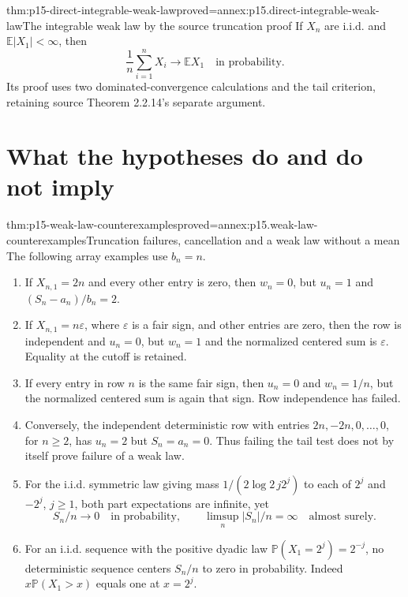 \begin{hbcorollary}{thm:p15-direct-integrable-weak-law}{proved=annex:p15.direct-integrable-weak-law}{The integrable weak law by the source truncation proof}
If \(X_n\) are i.i.d. and \(\mathbb E|X_1|<\infty\), then
\[
 \frac1n\sum_{i=1}^nX_i\longrightarrow\mathbb EX_1
                                         \quad\text{in probability}.
\]
Its proof uses two dominated-convergence calculations and the
tail criterion, retaining source Theorem 2.2.14's separate argument.
\end{hbcorollary}

\section{What the hypotheses do and do not imply}
\label{sec:p15-weak-law-boundaries}

\begin{hbtheorem}{thm:p15-weak-law-counterexamples}{proved=annex:p15.weak-law-counterexamples}{Truncation failures, cancellation and a weak law without a mean}
The following array examples use \(b_n=n\).
\begin{enumerate}
\item If \(X_{n,1}=2n\) and every other entry is zero, then
\(w_n=0\), but \(u_n=1\) and \((S_n-a_n)/b_n=2\).
\item If \(X_{n,1}=n\varepsilon\), where \(\varepsilon\) is a
fair sign, and other entries are zero, then the row is independent
and \(u_n=0\), but \(w_n=1\) and the normalized centered sum
is \(\varepsilon\). Equality at the cutoff is retained.
\item If every entry in row \(n\) is the same fair sign, then
\(u_n=0\) and \(w_n=1/n\), but the normalized centered sum is
again that sign. Row independence has failed.
\item Conversely, the independent deterministic row with entries
\(2n,-2n,0,\ldots,0\), for \(n\geq2\), has \(u_n=2\)
but \(S_n=a_n=0\). Thus failing the tail test does not by itself
prove failure of a weak law.
\item For the i.i.d. symmetric law giving mass
\(1/(2\log2\,j2^j)\) to each of \(2^j\) and \(-2^j\),
\(j\geq1\), both part expectations are infinite, yet
\[
 S_n/n\longrightarrow0\quad\text{in probability},\qquad
 \limsup_n|S_n|/n=\infty\quad\text{almost surely}.
\]
\item For an i.i.d. sequence with the positive dyadic law
\(\mathbb P(X_1=2^j)=2^{-j}\),
no deterministic sequence centers \(S_n/n\) to zero in probability.
Indeed \(x\mathbb P(X_1>x)\) equals one at \(x=2^j\).
\end{enumerate}
\end{hbtheorem}

